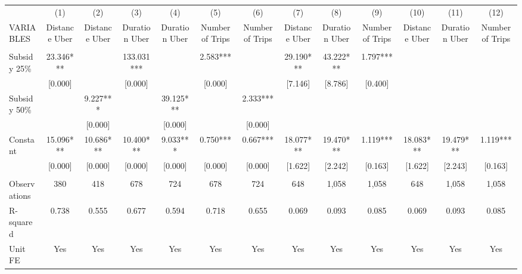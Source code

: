 \documentclass[]{article}
\begin{document}
\begin{tabular}{lcccccccccccc} \hline
 & (1) & (2) & (3) & (4) & (5) & (6) & (7) & (8) & (9) & (10) & (11) & (12) \\
VARIABLES & Distance Uber & Distance Uber & Duration Uber & Duration Uber & Number of Trips & Number of Trips & Distance Uber & Duration Uber & Number of Trips & Distance Uber & Duration Uber & Number of Trips \\ \hline
 &  &  &  &  &  &  &  &  &  &  &  &  \\
Subsidy 25\% & 23.346*** &  & 133.031*** &  & 2.583*** &  & 29.190*** & 43.222*** & 1.797*** &  &  &  \\
 & [0.000] &  & [0.000] &  & [0.000] &  & [7.146] & [8.786] & [0.400] &  &  &  \\
Subsidy 50\% &  & 9.227*** &  & 39.125*** &  & 2.333*** &  &  &  &  &  &  \\
 &  & [0.000] &  & [0.000] &  & [0.000] &  &  &  &  &  &  \\
Constant & 15.096*** & 10.686*** & 10.400*** & 9.033*** & 0.750*** & 0.667*** & 18.077*** & 19.470*** & 1.119*** & 18.083*** & 19.479*** & 1.119*** \\
 & [0.000] & [0.000] & [0.000] & [0.000] & [0.000] & [0.000] & [1.622] & [2.242] & [0.163] & [1.622] & [2.243] & [0.163] \\
 &  &  &  &  &  &  &  &  &  &  &  &  \\
Observations & 380 & 418 & 678 & 724 & 678 & 724 & 648 & 1,058 & 1,058 & 648 & 1,058 & 1,058 \\
R-squared & 0.738 & 0.555 & 0.677 & 0.594 & 0.718 & 0.655 & 0.069 & 0.093 & 0.085 & 0.069 & 0.093 & 0.085 \\
 Unit FE & Yes & Yes & Yes & Yes & Yes & Yes & Yes & Yes & Yes & Yes & Yes & Yes \\ \hline
\end{tabular}
\end{document}
